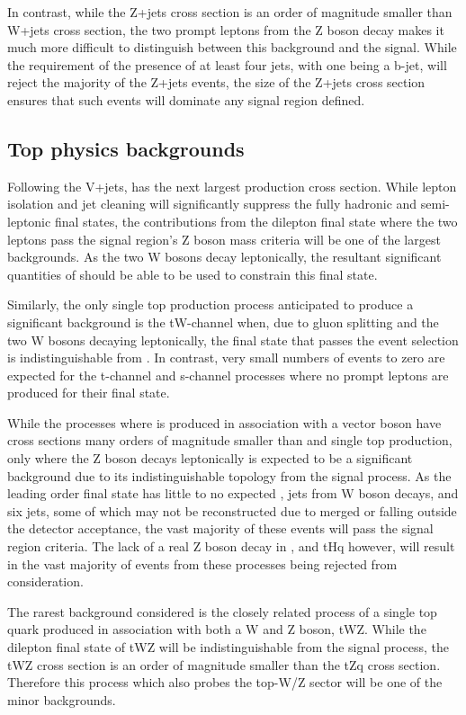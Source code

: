 In contrast, while the Z+jets cross section is an order of magnitude smaller than W+jets cross section, the two prompt leptons from the Z boson decay makes it much more difficult to distinguish between this background and the signal.
While the requirement of the presence of at least four jets, with one being a b-jet, will reject the majority of the Z+jets events, the size of the Z+jets cross section ensures that such events will dominate any signal region defined.

\subsection{Top physics backgrounds}
Following the V+jets, \ttbar has the next largest production cross section.
While lepton isolation and jet cleaning will significantly suppress the fully hadronic and semi-leptonic \ttbar final states, the contributions from the dilepton final state where the two leptons pass the signal region's Z boson mass criteria will be one of the largest backgrounds.
As the two W bosons decay leptonically, the resultant significant quantities of \MET should be able to be used to constrain this final state.

Similarly, the only single top production process anticipated to produce a significant background is the tW-channel when, due to gluon splitting and the two W bosons decaying leptonically, the final state that passes the event selection is indistinguishable from \ttbar.
In contrast, very small numbers of events to zero are expected for the t-channel and s-channel processes
where no prompt leptons are produced for their final state.

While the processes where \ttbar is produced in association with a vector boson have cross sections many orders of magnitude smaller than \ttbar and single top production, only \ttbarZ where the Z boson decays leptonically is expected to be a significant background due to its indistinguishable topology from the signal process.
As the leading order final state has little to no expected \MET, jets from W boson decays, and six jets,
some of which may not be reconstructed due to merged or falling outside the detector acceptance, the vast majority of these events will pass the signal region criteria.
The lack of a real Z boson decay in \ttbarW, \ttbarH and tHq however, will result in the vast majority of events from these processes being rejected from consideration.

The rarest background considered is the closely related process of a single top quark produced in association with both a W and Z boson, tWZ.
While the dilepton final state of tWZ will be indistinguishable from the signal process, the tWZ cross section is an order of magnitude smaller than the tZq cross section.
Therefore this process which also probes the top-W/Z sector will be one of the minor backgrounds.

